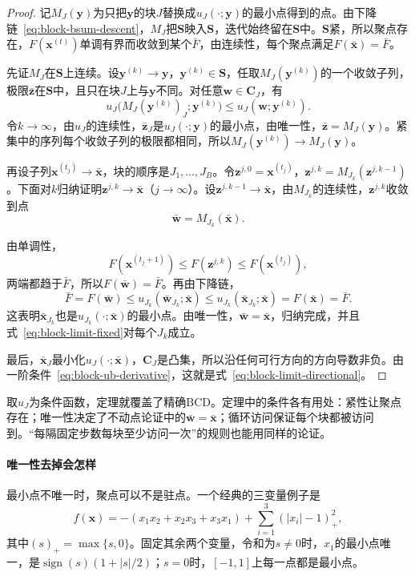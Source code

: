 \begin{proof}
记$M_J(\bm{y})$为只把$\bm{y}$的块$J$替换成$u_J(\cdot;\bm{y})$的最小点得到的点。由下降链~\eqref{eq:block-bsum-descent}，$M_J$把$\bm{S}$映入$\bm{S}$，迭代始终留在$\bm{S}$中。$\bm{S}$紧，所以聚点存在，$F(\bm{x}^{(t)})$单调有界而收敛到某个$\bar{F}$，由连续性，每个聚点满足$F(\bar{\bm{x}})=\bar{F}$。

先证$M_J$在$\bm{S}$上连续。设$\bm{y}^{(k)}\to\bm{y}$，$\bm{y}^{(k)}\in\bm{S}$，任取$M_J(\bm{y}^{(k)})$的一个收敛子列，极限$\bar{\bm{z}}$在$\bm{S}$中，且只在块$J$上与$\bm{y}$不同。对任意$\bm{w}\in\bm{C}_J$，有
\[
 u_J\bigl(M_J(\bm{y}^{(k)})_J;\bm{y}^{(k)}\bigr)\leq u_J(\bm{w};\bm{y}^{(k)}).
\]
令$k\to\infty$，由$u_J$的连续性，$\bar{\bm{z}}_J$是$u_J(\cdot;\bm{y})$的最小点，由唯一性，$\bar{\bm{z}}=M_J(\bm{y})$。紧集中的序列每个收敛子列的极限都相同，所以$M_J(\bm{y}^{(k)})\to M_J(\bm{y})$。

再设子列$\bm{x}^{(t_j)}\to\bar{\bm{x}}$，块的顺序是$J_1,\ldots,J_B$。令$\bm{z}^{j,0}=\bm{x}^{(t_j)}$，$\bm{z}^{j,k}=M_{J_k}(\bm{z}^{j,k-1})$。下面对$k$归纳证明$\bm{z}^{j,k}\to\bar{\bm{x}}$（$j\to\infty$）。设$\bm{z}^{j,k-1}\to\bar{\bm{x}}$，由$M_{J_k}$的连续性，$\bm{z}^{j,k}$收敛到点
\[
 \bar{\bm{w}}=M_{J_k}(\bar{\bm{x}}).
\]

由单调性，
\[
 F(\bm{x}^{(t_j+1)})\leq F(\bm{z}^{j,k})\leq F(\bm{x}^{(t_j)}),
\]
两端都趋于$\bar{F}$，所以$F(\bar{\bm{w}})=\bar{F}$。再由下降链，
\[
 \bar{F}=F(\bar{\bm{w}})\leq u_{J_k}(\bar{\bm{w}}_{J_k};\bar{\bm{x}})\leq u_{J_k}(\bar{\bm{x}}_{J_k};\bar{\bm{x}})=F(\bar{\bm{x}})=\bar{F}.
\]
这表明$\bar{\bm{x}}_{J_k}$也是$u_{J_k}(\cdot;\bar{\bm{x}})$的最小点。由唯一性，$\bar{\bm{w}}=\bar{\bm{x}}$，归纳完成，并且式~\eqref{eq:block-limit-fixed}对每个$J_k$成立。

最后，$\bar{\bm{x}}_J$最小化$u_J(\cdot;\bar{\bm{x}})$，$\bm{C}_J$是凸集，所以沿任何可行方向的方向导数非负。由一阶条件~\eqref{eq:block-ub-derivative}，这就是式~\eqref{eq:block-limit-directional}。
\end{proof}

取$u_J$为条件函数，定理就覆盖了精确BCD。定理中的条件各有用处：紧性让聚点存在；唯一性决定了不动点论证中的$\bar{\bm{w}}=\bar{\bm{x}}$；循环访问保证每个块都被访问到。“每隔固定步数每块至少访问一次”的规则也能用同样的论证。

\paragraph{唯一性去掉会怎样}
最小点不唯一时，聚点可以不是驻点。一个经典的三变量例子是
\[
 f(\bm{x})=-(x_1x_2+x_2x_3+x_3x_1)+\sum_{i=1}^{3}(\lvert x_i\rvert-1)_+^2 ,
\]
其中$(s)_+=\max\{s,0\}$。固定其余两个变量，令和为$s\neq0$时，$x_1$的最小点唯一，是$\operatorname{sign}(s)(1+\lvert s\rvert/2)$；$s=0$时，$[-1,1]$上每一点都是最小点。

